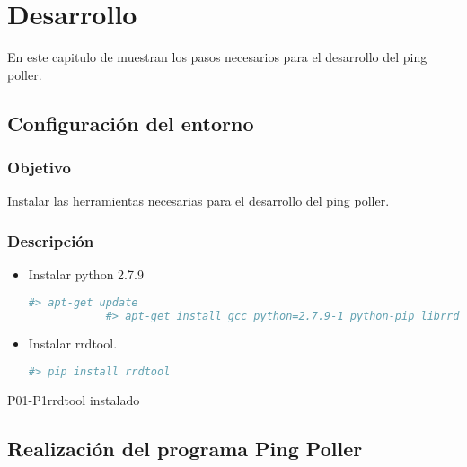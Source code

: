 \section{Desarrollo}
En este capitulo de muestran los pasos necesarios para el desarrollo del ping poller.


\subsection{Configuración del entorno}

\subsubsection{Objetivo}
Instalar las herramientas necesarias para el desarrollo del ping poller.

\subsubsection{Descripción}
\begin{itemize}
	\item Instalar python 2.7.9\\
		\begin{lstlisting}[language=bash]
			#> apt-get update
			#> apt-get install gcc python=2.7.9-1 python-pip librrd-dev libpython-dev
		\end{lstlisting}
	\item Instalar rrdtool.\\
		\begin{lstlisting}[language=bash]
			#> pip install rrdtool
		\end{lstlisting}
\end{itemize}

\newpage
\begin{prueba}{P01-P1}{rrdtool instalado}
\end{prueba}


\subsection{Realización del programa Ping Poller}

